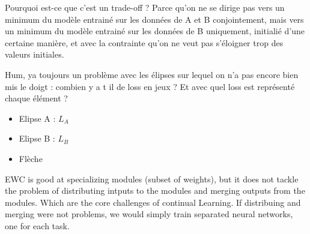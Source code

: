 \documentclass[11pt]{article}
\begin{document}
\vspace{1mm}
\noindent
Pourquoi est-ce que c'est un trade-off ? Parce qu'on ne se dirige pas vers un minimum du modèle entrainé sur les données de A et B conjointement, mais vers un minimum du modèle entrainé sur les données de B uniquement, initialié d'une certaine manière, et avec la contrainte qu'on ne veut pas s'éloigner trop des valeurs initiales.

\vspace{1mm}
\noindent
Hum, ya toujours un problème avec les élipses sur lequel on n'a pas encore bien mis le doigt : combien y a t il de loss en jeux ? Et avec quel loss est représenté chaque élément ?
\begin{itemize}
    \item Elipse A : $L_A$
    \item Elipse B : $L_B$
    \item Flèche
\end{itemize}

\vspace{1mm}
\noindent
EWC is good at specializing modules (subset of weights), but it does not tackle the problem of distributing intputs to the modules and merging outputs from the modules. Which are the core challenges of continual Learning. If distribuing and merging were not problems, we would simply train separated neural networks, one for each task.
\end{document}
